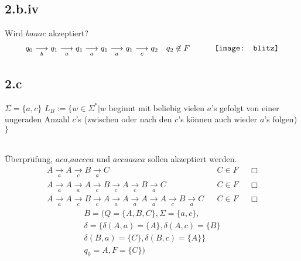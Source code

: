 \documentclass[10pt,ngerman]{scrartcl}
\begin{document}
\subsection{2.b.iv}
Wird $baaac$ akzeptiert?
\begin{align*}
 q_0 \underset{b}{\longrightarrow} q_1 \underset{a}{\longrightarrow} q_1 \underset{a}{\longrightarrow} q_1 \underset{a}{\longrightarrow} q_1 \underset{c}{\longrightarrow} q_2 && q_2 \not \in F && \qquad \vcenter{\hbox{\texttt{[image: blitz]}}}
\end{align*}
\pagebreak
\subsection{2.c}
$\Sigma=\{a,c\}$ $L_B := \{w \in \Sigma^* | w $ beginnt mit beliebig vielen $a$'s gefolgt von einer ungeraden Anzahl $c$'s (zwischen oder nach den $c$'s können auch wieder $a$'s folgen) $\}$
\begin{figure}[ht] %
\centering %
\end{figure}\\
Überprüfung, $aca$,$aaccca$ und $accaaaca$ sollen akzeptiert werden.
\begin{align*}
A \underset{a}{\longrightarrow} A \underset{c}{\longrightarrow} B \underset{a}{\longrightarrow} C && C \in F && \Box\\
A \underset{a}{\longrightarrow} A \underset{a}{\longrightarrow} A \underset{c}{\longrightarrow} B \underset{c}{\longrightarrow} A \underset{c}{\longrightarrow} B \underset{a}{\longrightarrow} C && C \in F && \Box \\
A \underset{a}{\longrightarrow} A \underset{c}{\longrightarrow} B \underset{c}{\longrightarrow} A \underset{a}{\longrightarrow} A \underset{a}{\longrightarrow} A \underset{a}{\longrightarrow} A \underset{c}{\longrightarrow} B \underset{a}{\longrightarrow} C && C \in F && \Box
\end{align*}
\begin{align*}
 B=(Q=\{A,B,C\}, \Sigma= \{a,c\},\\
 \delta = \{\delta(A,a) = \{A\} , \delta(A,c) = \{B\}\\
 \delta(B,a) = \{C\},\delta(B,c) = \{A\}\}\\
 q_0=A,F=\{C\})
\end{align*}
\end{document}
